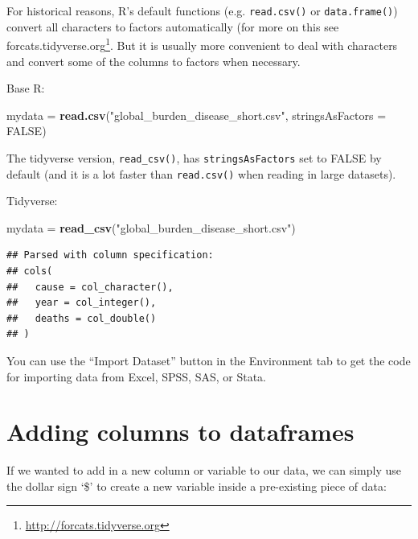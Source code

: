 \documentclass[]{book}
\makeatletter
\newenvironment{Shaded}{\begin{snugshade}}{\end{snugshade}}
\newcommand{\KeywordTok}[1]{\textcolor[rgb]{0.13,0.29,0.53}{\textbf{#1}}}
\newcommand{\DataTypeTok}[1]{\textcolor[rgb]{0.13,0.29,0.53}{#1}}
\newcommand{\DecValTok}[1]{\textcolor[rgb]{0.00,0.00,0.81}{#1}}
\newcommand{\StringTok}[1]{\textcolor[rgb]{0.31,0.60,0.02}{#1}}
\newcommand{\OtherTok}[1]{\textcolor[rgb]{0.56,0.35,0.01}{#1}}
\newcommand{\OperatorTok}[1]{\textcolor[rgb]{0.81,0.36,0.00}{\textbf{#1}}}
\newcommand{\NormalTok}[1]{#1}
\let\rmarkdownfootnote\footnote%
\def\footnote{\protect\rmarkdownfootnote}
\renewcommand{\href}[2]{#2\footnote{\url{#1}}}
\newenvironment{kframe}{%
\medskip{}
\setlength{\fboxsep}{.8em}
 \def\at@end@of@kframe{}%
 \ifinner\ifhmode%
  \def\at@end@of@kframe{\end{minipage}}%
  \begin{minipage}{\columnwidth}%
 \fi\fi%
 \def\FrameCommand##1{\hskip\@totalleftmargin \hskip-\fboxsep
 \colorbox{shadecolor}{##1}\hskip-\fboxsep
     \hskip-\linewidth \hskip-\@totalleftmargin \hskip\columnwidth}%
 \MakeFramed {\advance\hsize-\width
   \@totalleftmargin\z@ \linewidth\hsize
   \@setminipage}}%
 {\par\unskip\endMakeFramed%
 \at@end@of@kframe}
\renewenvironment{Shaded}{\begin{kframe}}{\end{kframe}}
\makeatother
\begin{document}
For historical reasons, R's default functions (e.g. \texttt{read.csv()}
or \texttt{data.frame()}) convert all characters to factors
automatically (for more on this see
\href{http://forcats.tidyverse.org}{forcats.tidyverse.org}. But it is
usually more convenient to deal with characters and convert some of the
columns to factors when necessary.

Base R:

\begin{Shaded}
\begin{Highlighting}[]
\NormalTok{mydata =}\StringTok{ }\KeywordTok{read.csv}\NormalTok{(}\StringTok{"global_burden_disease_short.csv"}\NormalTok{, }\DataTypeTok{stringsAsFactors =} \OtherTok{FALSE}\NormalTok{)}
\end{Highlighting}
\end{Shaded}

The tidyverse version, \texttt{read\_csv()}, has
\texttt{stringsAsFactors} set to FALSE by default (and it is a lot
faster than \texttt{read.csv()} when reading in large datasets).

Tidyverse:

\begin{Shaded}
\begin{Highlighting}[]
\NormalTok{mydata =}\StringTok{ }\KeywordTok{read_csv}\NormalTok{(}\StringTok{"global_burden_disease_short.csv"}\NormalTok{)}
\end{Highlighting}
\end{Shaded}

\begin{verbatim}
## Parsed with column specification:
## cols(
##   cause = col_character(),
##   year = col_integer(),
##   deaths = col_double()
## )
\end{verbatim}

You can use the ``Import Dataset'' button in the Environment tab to get
the code for importing data from Excel, SPSS, SAS, or Stata.

\section{Adding columns to
dataframes}\label{adding-columns-to-dataframes}

If we wanted to add in a new column or variable to our data, we can
simply use the dollar sign `\$' to create a new variable inside a
pre-existing piece of data:

\begin{Shaded}
\end{Shaded}
\end{document}

